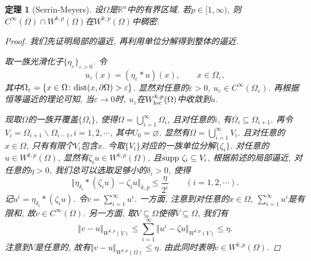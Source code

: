 \documentclass[12pt,a4paper]{article}
\newtheorem{theorem}{定理}[section]
\begin{document}
\begin{theorem}[Serrin-Meyers]
    设$\Omega$是$\mathbb{R}^n$中的有界区域. 若$p \in [1, \infty)$, 则$C^{\infty}(\Omega) \cap W^{k, p}(\Omega)$在$W^{k, p}(\Omega)$中稠密.
    \begin{proof}
        我们先证明局部的逼近, 再利用单位分解得到整体的逼近.

        取一族光滑化子$\{\eta_{\varepsilon}\}_{\varepsilon > 0}$. 令
        \begin{equation*}
            u_{\varepsilon}(x) = (\eta_{\varepsilon} \ast u)(x), \qquad x \in \Omega_{\varepsilon},
        \end{equation*}
        其中$\Omega_{\varepsilon} = \{x \in \Omega\colon {\rm dist}(x, \partial\Omega) > \varepsilon\}$.
        显然对任意的$\varepsilon > 0$, $u_{\varepsilon} \in C^{\infty}(\Omega_{\varepsilon})$. 再根据恒等逼近的理论可知, 当$\varepsilon \rightarrow 0$时, $u_{\varepsilon}$在$W_{{\rm loc}}^{k, p}(\Omega)$中收敛到$u$.

        现取$\Omega$的一族开覆盖$\{\Omega_i\}$, 使得$\Omega = \bigcup_{i = 1}^{\infty}\Omega_i$, 且对任意的$i$, 有$\overline{\Omega_i} \subseteq \Omega_{i + 1}$.
        再令$V_i = \Omega_{i + 1} \smallsetminus \overline{\Omega_{i - 1}}, i = 1, 2, \cdots$, 其中$U_0 = \varnothing$.
        显然有$\Omega = \bigcup_{i = 1}^{\infty}V_i$. 且对任意的$x \in \Omega$, 只有有限个$V_i$包含$x$.
        今取$\{V_i\}$对应的一族单位分解$\{\zeta_i\}$. 对任意的$u \in W^{k, p}(\Omega)$, 显然有$\zeta_iu \in W^{k, p}(\Omega)$, 且${\rm supp}\ \zeta_i \subseteq V_i$, 根据前述的局部逼近, 对任意的$\eta > 0$, 我们总可以选取足够小的$\delta_i > 0$, 使得 
        \begin{equation*}
            \Vert \eta_{\delta_i} \ast (\zeta_iu) - \zeta_iu\Vert_{k, p} \leq \frac{\eta}{2^i} \qquad (i = 1, 2, \cdots).
        \end{equation*}
        记$u^i = \eta_{\delta_i} \ast (\zeta_iu)$. 令$v = \sum_{i = 1}^{\infty}u^i$.
        一方面, 注意到对任意的$x \in \Omega$, $\sum_{i = 1}^{\infty}u^i$是有限和, 故$v \in C^{\infty}(\Omega)$.
        另一方面, 取$V \subseteq \Omega$使得$\overline{V} \subseteq \Omega$, 我们有
        \begin{equation*}
            \Vert v - u \Vert_{W^{k, p}(V)} \leq \sum_{i = 1}^{\infty}\Vert u^i - \zeta u\Vert_{W^{k, p}(V)} \leq \eta.
        \end{equation*}
        注意到$V$是任意的, 故有$\Vert v - u \Vert_{W^{k, p}(\Omega)} \leq \eta$. 由此同时表明$v \in W^{k, p}(\Omega)$.
    \end{proof}
\end{theorem}
\end{document}
